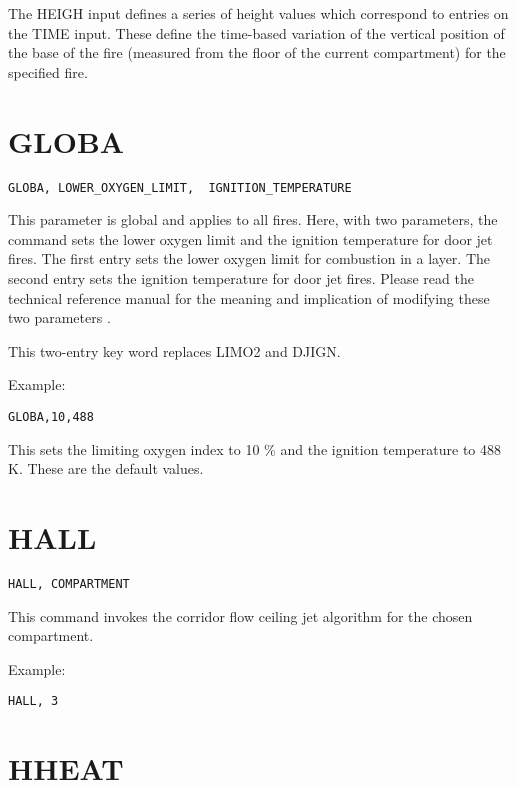 The HEIGH input defines a series of height values which correspond to entries on the TIME input.  These define the time-based variation of the vertical position of the base of the fire (measured from the floor of the current compartment) for the specified fire.

\section{GLOBA}

\begin{lstlisting}
GLOBA, LOWER_OXYGEN_LIMIT,  IGNITION_TEMPERATURE
\end{lstlisting}

This parameter is global and applies to all fires. Here, with two parameters, the command sets the lower oxygen limit and the ignition temperature for door jet fires. The first entry sets the lower oxygen limit for combustion in a layer. The second entry sets the ignition temperature for door jet fires. Please read the technical reference manual for the meaning and implication of modifying these two parameters \cite{CFAST_Tech_Guide_7}.

This two-entry key word replaces LIMO2 and DJIGN.

Example:

\begin{lstlisting}
GLOBA,10,488
\end{lstlisting}

This sets the limiting oxygen index to 10 \% and the ignition temperature to 488 K. These are the default values.

\section{HALL}

\begin{lstlisting}
HALL, COMPARTMENT
\end{lstlisting}

This command invokes the corridor flow ceiling jet algorithm for the chosen compartment.

Example:

\begin{lstlisting}
HALL, 3 
\end{lstlisting}

\section{HHEAT}

